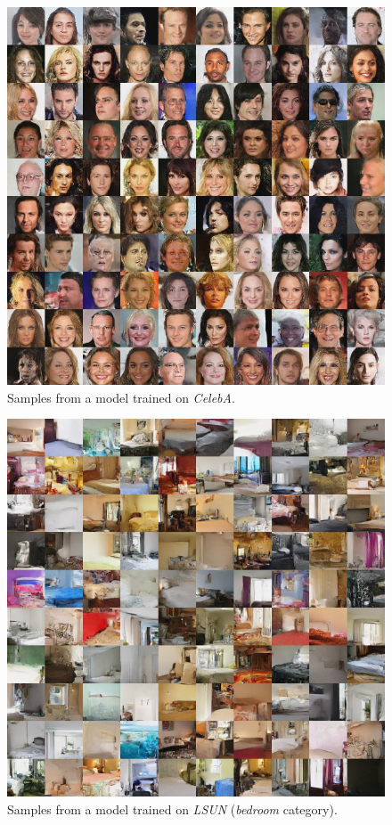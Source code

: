 \documentclass{article}
\begin{document}
\begin{figure}[H]
\vspace{80pt}
    \centering \includegraphics[width=1.\textwidth]{celeba_samples.jpg}
    \caption{Samples from a model trained on \emph{CelebA}.}
\end{figure}

\begin{figure}[H]
\vspace{80pt}
    \centering \includegraphics[width=1.\textwidth]{bedroom_samples.jpg}
    \caption{Samples from a model trained on \emph{LSUN} (\emph{bedroom} category).}
\end{figure}
\end{document}
